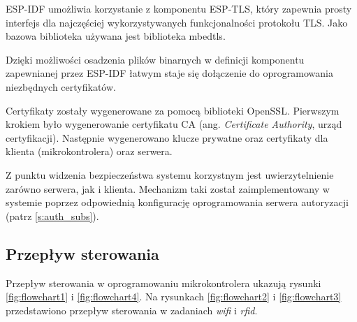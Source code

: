            ESP-IDF umożliwia korzystanie z komponentu ESP-TLS, który zapewnia prosty interfejs dla najczęściej wykorzystywanych funkcjonalności protokołu TLS. Jako bazowa biblioteka używana jest biblioteka mbedtls.

            Dzięki możliwości osadzenia plików binarnych w definicji komponentu zapewnianej przez ESP-IDF łatwym staje się dołączenie do oprogramowania niezbędnych certyfikatów.

            Certyfikaty zostały wygenerowane za pomocą biblioteki OpenSSL. Pierwszym krokiem było wygenerowanie certyfikatu CA (ang. \textit{Certificate Authority}, urząd certyfikacji). Następnie wygenerowano klucze prywatne oraz certyfikaty dla klienta (mikrokontrolera) oraz serwera.

            Z punktu widzenia bezpieczeństwa systemu korzystnym jest uwierzytelnienie zarówno serwera, jak i klienta. Mechanizm taki został zaimplementowany w systemie poprzez odpowiednią konfigurację oprogramowania serwera autoryzacji (patrz \ref{s:auth_subs}).

        \subsection{Przepływ sterowania}

            Przepływ sterowania w oprogramowaniu mikrokontrolera ukazują rysunki \ref{fig:flowchart1} i \ref{fig:flowchart4}. Na rysunkach \ref{fig:flowchart2} i \ref{fig:flowchart3} przedstawiono przepływ sterowania w zadaniach \textit{wifi} i \textit{rfid}.

